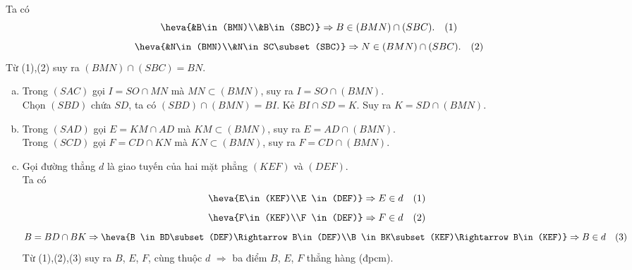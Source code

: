 \begin{bt}
\begin{bt}
{{}
		
		Ta có 
		$$\heva{&B\in(BMN)\\&B\in(SBC)}\Rightarrow B\in(BMN)\cap(SBC).\quad(1)$$
		$$\heva{&N\in(BMN)\\&N\in SC\subset(SBC)}\Rightarrow N\in(BMN)\cap(SBC).\quad(2)$$
		Từ (1),(2) suy ra $(BMN)\cap(SBC)=BN$.
		\begin{enumerate}[b)]
			\item Trong $(SAC)$ gọi $I=SO\cap MN$ mà $MN\subset(BMN)$, suy ra $I=SO\cap(BMN)$.\\
			Chọn $(SBD)$ chứa $SD$, ta có $(SBD)\cap(BMN)=BI$. Kẻ $BI\cap SD=K$. Suy ra $K=SD\cap(BMN)$.
			\item Trong $(SAD)$ gọi $E=KM\cap AD$ mà $KM\subset(BMN)$, suy ra $E=AD\cap(BMN)$.\\
			Trong $(SCD)$ gọi $F=CD\cap KN$ mà $KN\subset(BMN)$, suy ra $F=CD\cap(BMN)$.
			\item Gọi đường thẳng $d$ là giao tuyến của hai mặt phẳng $(KEF)$ và $(DEF)$.\\
			Ta có 
			$$\heva{E\in(KEF)\\E \in(DEF)}\Rightarrow E\in d\quad (1)$$
			$$\heva{F\in(KEF)\\F \in(DEF)}\Rightarrow F\in d\quad (2)$$
			$$B=BD\cap BK \Rightarrow \heva{B \in BD\subset (DEF)\Rightarrow B\in(DEF)\\B \in BK\subset (KEF)\Rightarrow B\in(KEF)}\Rightarrow B\in d\quad (3)$$
			Từ (1),(2),(3) suy ra $B$, $E$, $F$, cùng thuộc $d$ $\Rightarrow$ ba điểm $B$, $E$, $F$ thẳng hàng (đpcm).
	\end{enumerate}	}
\end{bt}


\end{bt}
